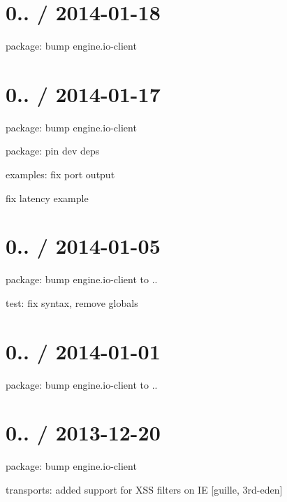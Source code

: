 \section*{0.. / 2014-\/01-\/18 }


\begin{DoxyItemize}
\item package\+: bump {\ttfamily engine.\+io-\/client}
\end{DoxyItemize}

\section*{0.. / 2014-\/01-\/17 }


\begin{DoxyItemize}
\item package\+: bump {\ttfamily engine.\+io-\/client}
\item package\+: pin dev deps
\item examples\+: fix port output
\item fix latency example
\end{DoxyItemize}

\section*{0.. / 2014-\/01-\/05 }


\begin{DoxyItemize}
\item package\+: bump {\ttfamily engine.\+io-\/client} to {..}
\item test\+: fix syntax, remove globals
\end{DoxyItemize}

\section*{0.. / 2014-\/01-\/01 }


\begin{DoxyItemize}
\item package\+: bump {\ttfamily engine.\+io-\/client} to {..}
\end{DoxyItemize}

\section*{0.. / 2013-\/12-\/20 }


\begin{DoxyItemize}
\item package\+: bump {\ttfamily engine.\+io-\/client}
\item transports\+: added support for X\+SS filters on IE \mbox{[}guille, 3rd-\/eden\mbox{]}
\end{DoxyItemize}

